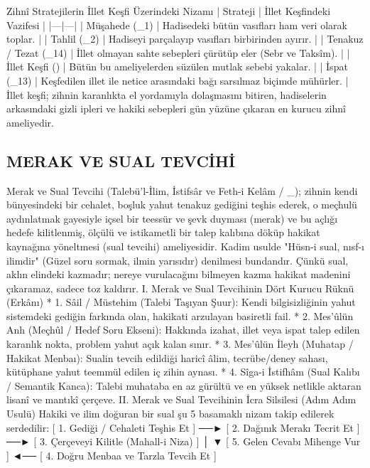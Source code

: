 \documentclass[11pt,a4paper]{article}
\begin{document}
Zihnî Stratejilerin İllet Keşfi Üzerindeki Nizamı
| Strateji | İllet Keşfindeki Vazifesi |
|---|---|
| Müşahede (_1) | Hadisedeki bütün vasıfları ham veri olarak toplar. |
| Tahlil (_2) | Hadiseyi parçalayıp vasıfları birbirinden ayırır. |
| Tenakuz / Tezat (_{14}) | İllet olmayan sahte sebepleri çürütüp eler (Sebr ve Taksîm). |
| İllet Keşfi () | Bütün bu ameliyelerden süzülen mutlak sebebi yakalar. |
| İspat (_{13}) | Keşfedilen illet ile netice arasındaki bağı sarsılmaz biçimde mühürler. |
İllet keşfi; zihnin karanlıkta el yordamıyla dolaşmasını bitiren, hadiselerin arkasındaki gizli ipleri ve hakiki sebepleri gün yüzüne çıkaran en kurucu zihnî ameliyedir.




\subsection{MERAK VE SUAL TEVCİHİ}


Merak ve Sual Tevcihi (Talebü’l-İlim, İstifsâr ve Feth-i Kelâm / _{}); zihnin kendi bünyesindeki bir cehalet, boşluk yahut tenakuz gediğini teşhis ederek, o meçhulü aydınlatmak gayesiyle içsel bir teessür ve şevk duyması (merak) ve bu açlığı hedefe kilitlenmiş, ölçülü ve istikametli bir talep kalıbına döküp hakikat kaynağına yöneltmesi (sual tevcihi) ameliyesidir.
Kadim usulde "Hüsn-i sual, nısf-ı ilimdir" (Güzel soru sormak, ilmin yarısıdır) denilmesi bundandır. Çünkü sual, aklın elindeki kazmadır; nereye vurulacağını bilmeyen kazma hakikat madenini çıkaramaz, sadece toz kaldırır.
I. Merak ve Sual Tevcihinin Dört Kurucu Rüknü (Erkânı)
 * 1. Sâil / Müstehim (Talebi Taşıyan Şuur): Kendi bilgisizliğinin yahut sistemdeki gediğin farkında olan, hakikati arzulayan basiretli fail.
 * 2. Mes'ûlün Anh (Meçhûl / Hedef Soru Ekseni): Hakkında izahat, illet veya ispat talep edilen karanlık nokta, problem yahut açık kalan sınır.
 * 3. Mes'ûlün İleyh (Muhatap / Hakikat Menbaı): Sualin tevcih edildiği haricî âlim, tecrübe/deney sahası, kütüphane yahut teemmül edilen iç zihin aynası.
 * 4. Sîga-i İstifhâm (Sual Kalıbı / Semantik Kanca): Talebi muhataba en az gürültü ve en yüksek netlikle aktaran lisanî ve mantıkî çerçeve.
II. Merak ve Sual Tevcihinin İcra Silsilesi (Adım Adım Usulü)
Hakiki ve ilim doğuran bir sual şu 5 basamaklı nizam takip edilerek serdedilir:
[ 1. Gediği / Cehaleti Teşhis Et ] ──► [ 2. Dağınık Merakı Tecrit Et ] ──► [ 3. Çerçeveyi Kilitle (Mahall-i Niza) ]
                                                                                         │
                                                                                         ▼
[ 5. Gelen Cevabı Mihenge Vur ] ◄── [ 4. Doğru Menbaa ve Tarzla Tevcih Et ]
\end{document}
